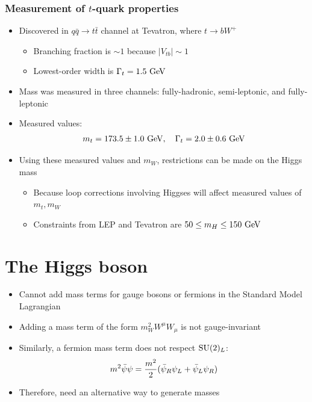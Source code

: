 \subsubsection{Measurement of $t$-quark properties}
\begin{itemize}
  \item Discovered in $q\bar q \rightarrow t\bar t$ channel at Tevatron, where $t\rightarrow b W^+$
  \begin{itemize}
    \item Branching fraction is $\sim 1$ because $|V_{tb}|\sim 1$
    \item Lowest-order width is $\Gamma_t = 1.5~\text{GeV}$
  \end{itemize}
  \item Mass was measured in three channels: fully-hadronic, semi-leptonic, and fully-leptonic
  \item Measured values:
  \begin{equation}
    m_t = 173.5\pm 1.0~\text{GeV}, \quad \Gamma_t = 2.0 \pm 0.6~\text{GeV}
  \end{equation}
  \item Using these measured values and $m_W$, restrictions can be made on the Higgs mass
  \begin{itemize}
    \item Because loop corrections involving Higgses will affect measured values of $m_t,m_W$
    \item Constraints from LEP and Tevatron are $50 \leq m_H \leq 150~\text{GeV}$
  \end{itemize}
\end{itemize}

\section{The Higgs boson}
\begin{itemize}
  \item Cannot add mass terms for gauge bosons or fermions in the Standard Model Lagrangian
  \item Adding a mass term of the form $m_W^2 W^\mu W_\mu$ is not gauge-invariant
  \item Similarly, a fermion mass term does not respect $\operatorname{SU}(2)_L$:
  \begin{equation}
    m^2 \bar{\psi} \psi = \frac{m^2}{2} (\bar{\psi}_R \psi_L + \bar{\psi}_L\psi_R )
  \end{equation}
  \item Therefore, need an alternative way to generate masses
\end{itemize}

